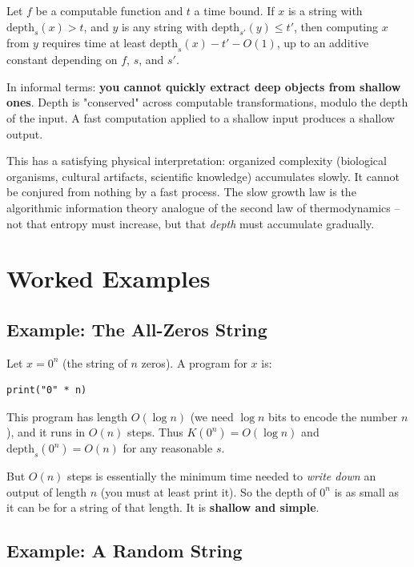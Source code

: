 \begin{theorem}
Let $f$ be a computable function and $t$ a time bound. If $x$ is a string with $\text{depth}_s(x) > t$, and $y$ is any string with $\text{depth}_{s'}(y) \leq t'$, then computing $x$ from $y$ requires time at least $\text{depth}_s(x) - t' - O(1)$, up to an additive constant depending on $f$, $s$, and $s'$.

In informal terms: \textbf{you cannot quickly extract deep objects from shallow ones}. Depth is "conserved" across computable transformations, modulo the depth of the input. A fast computation applied to a shallow input produces a shallow output.

This has a satisfying physical interpretation: organized complexity (biological organisms, cultural artifacts, scientific knowledge) accumulates slowly. It cannot be conjured from nothing by a fast process. The slow growth law is the algorithmic information theory analogue of the second law of thermodynamics -- not that entropy must increase, but that \textit{depth} must accumulate gradually.
\end{theorem}

\section{Worked Examples}

\subsection*{Example: The All-Zeros String}

Let $x = 0^n$ (the string of $n$ zeros). A program for $x$ is:

\begin{verbatim}
print("0" * n)
\end{verbatim}

This program has length $O(\log n)$ (we need $\log n$ bits to encode the number $n$), and it runs in $O(n)$ steps. Thus $K(0^n) = O(\log n)$ and $\text{depth}_s(0^n) = O(n)$ for any reasonable $s$.

But $O(n)$ steps is essentially the minimum time needed to \textit{write down} an output of length $n$ (you must at least print it). So the depth of $0^n$ is as small as it can be for a string of that length. It is \textbf{shallow and simple}.

\subsection*{Example: A Random String}

